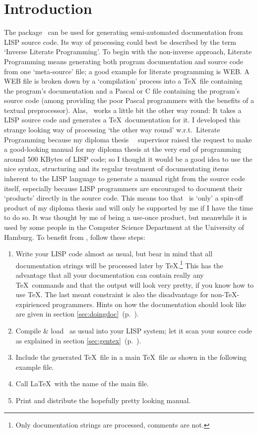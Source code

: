 %
%
\chapter{Introduction}
%
The package \ can be used for generating semi-automated
documentation from LISP source code. Its way of processing could best
be described by the term `Inverse Literate Programming'. To begin with
the non-inverse approach, Literate Programming means generating both
program documentation and source code from one `meta-source' file; a
good example for literate programming is WEB. A WEB file is broken
down by a `compilation' process into a \TeX\ file containing the
program's documentation and a Pascal or C file containing the
program's source code (among providing the poor Pascal programmers
with the benefits of a textual preprocessor). Alas, \
works a little bit the other way round: It takes a LISP source code
and generates a \TeX\ documentation for it. I developed this strange
looking way of processing `the other way round' w.r.t.\ Literate
Programming because my diploma thesis
\cite{bib:ki94}\ \cite{bib:ki95}\ supervisor raised the request to
make a good-looking manual for my diploma thesis at the very end of
programming around 500 KBytes of LISP code; so I thought it would be a
good idea to use the nice syntax, structuring and its regular
treatment of documentating items inherent to the LISP language to
generate a manual right from the source code itself, especially
because LISP programmers are encouraged to document their `products'
directly in the source code. This means too that \lisp{lisp-doc}\ is
`only' a spin-off product of my diploma thesis and will only be
supported by me if I have the time to do so. It was thought by me of
being a use-once product, but meanwhile it is used by some people in
the Computer Science Department at the University of Hamburg. To
benefit from \lisp{lisp-doc}, follow these steps:
\begin{enumerate}
%
\item Write your LISP code almost as usual, but bear in mind that all
documentation strings will be processed later by \TeX.\footnote{Only
documentation strings are processed, comments are not.} This has the
advantage that all your documentation can contain really any \TeX\
commands and that the output will look very pretty, if you know how to
use \TeX. The last meant constraint is also the disadvantage for
non-\TeX-expirienced programmers. Hints on how the documentation
should look like are given in
section \ref{sec:doingdoc}\ (p.\ \pageref{sec:doingdoc}).
%
\item Compile \& load \ as usual into your LISP system;
let it scan your source code as explained in section
\ref{sec:gentex}\ (p.\ \pageref{sec:gentex}).
%
\item Include the generated \TeX\ file in a main \TeX\ file as shown
in the following example file.
%
\item Call \LaTeX\ with the name of the main file.
%
\item Print and distribute the hopefully pretty looking manual.
%
\end{enumerate}
